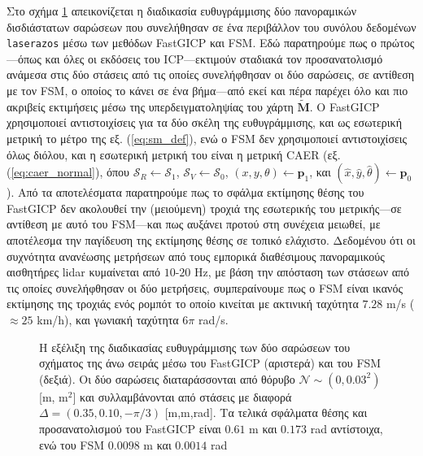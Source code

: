 Στο σχήμα \ref{fig:02_05_04:02} απεικονίζεται η διαδικασία ευθυγράμμισης δύο
πανοραμικών δισδιάστατων σαρώσεων που συνελήθησαν σε ένα περιβάλλον του συνόλου
δεδομένων \texttt{laserazos} μέσω των μεθόδων FastGICP
και FSM.  Εδώ παρατηρούμε πως ο πρώτος---όπως και όλες οι εκδόσεις του
ICP---εκτιμούν σταδιακά τον προσανατολισμό ανάμεσα στις δύο στάσεις από τις
οποίες συνελήφθησαν οι δύο σαρώσεις, σε αντίθεση με τον FSM, ο οποίος το κάνει
σε ένα βήμα---από εκεί και πέρα παρέχει όλο και πιο ακριβείς εκτιμήσεις μέσω
της υπερδειγματοληψίας του χάρτη $\widetilde{\bm{M}}$. Ο FastGICP χρησιμοποιεί
αντιστοιχίσεις για τα δύο σκέλη της ευθυγράμμισης, και ως εσωτερική μετρική το
μέτρο της εξ. (\ref{eq:sm_def}), ενώ ο FSM δεν χρησιμοποιεί αντιστοιχίσεις
όλως διόλου, και η εσωτερική μετρική του είναι η μετρική CAER (εξ.
(\ref{eq:caer_normal}), όπου $\mathcal{S}_R \leftarrow \mathcal{S}_1$,
$\mathcal{S}_V \leftarrow \mathcal{S}_0$, $(x,y,\theta)\leftarrow\bm{p}_1$, και
$(\hat{x}, \hat{y}, \hat{\theta}) \leftarrow \bm{p}_0$). Από τα αποτελέσματα
παρατηρούμε πως το σφάλμα εκτίμησης θέσης του FastGICP δεν ακολουθεί την
(μειούμενη) τροχιά της εσωτερικής του μετρικής---σε αντίθεση με αυτό του
FSM---και πως αυξάνει προτού στη συνέχεια μειωθεί, με αποτέλεσμα την
παγίδευση της εκτίμησης θέσης σε τοπικό ελάχιστο. Δεδομένου ότι οι συχνότητα
ανανέωσης μετρήσεων από τους εμπορικά διαθέσιμους πανοραμικούς αισθητήρες lidar
κυμαίνεται από $10$-$20$ Hz, με βάση την απόσταση των στάσεων από τις οποίες
συνελήφθησαν οι δύο μετρήσεις, συμπεραίνουμε πως ο FSM είναι ικανός εκτίμησης
της τροχιάς ενός ρομπότ το οποίο κινείται με ακτινική ταχύτητα $7.28$ m/s
($\approx 25$ km/h), και γωνιακή ταχύτητα $6\pi$ rad/s.

\begin{figure}[]\centering
  
  \vspace{0.5cm}
  \caption{\small Η εξέλιξη της διαδικασίας ευθυγράμμισης των δύο σαρώσεων του
           σχήματος της άνω σειράς μέσω του FastGICP (αριστερά) και του
           FSM (δεξιά). Οι δύο σαρώσεις διαταράσσονται από θόρυβο
           $\mathcal{N} \sim (0, 0.03^2)$ [m, m$^2$] και συλλαμβάνονται από
           στάσεις με διαφορά $\Delta = (0.35, 0.10, -\pi/3)$ [m,m,rad].
           Τα τελικά σφάλματα θέσης και προσανατολισμού του FastGICP είναι
           $0.61$ m και $0.173$ rad αντίστοιχα, ενώ του FSM
           $0.0098$ m και $0.0014$ rad}
  \label{fig:02_05_04:02}
\end{figure}


